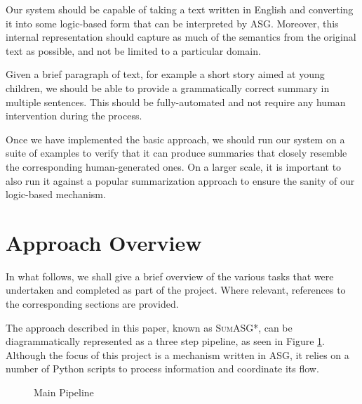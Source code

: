 \begin{objective}
Our system should be capable of taking a text written in English and converting it into some logic-based form that can be interpreted by ASG. Moreover, this internal representation should capture as much of the semantics from the original text as possible, and not be limited to a particular domain.
\end{objective}

\begin{objective}
Given a brief paragraph of text, for example a short story aimed at young children, we should be able to provide a grammatically correct summary in multiple sentences. This should be fully-automated and not require any human intervention during the process.
\end{objective}

\begin{objective}
Once we have implemented the basic approach, we should run our system on a suite of examples to verify that it can produce summaries that closely resemble the corresponding human-generated ones. On a larger scale, it is important to also run it against a popular summarization approach to ensure the sanity of our logic-based mechanism.
\end{objective}

\section{Approach Overview}

In what follows, we shall give a brief overview of the various tasks that were undertaken and completed as part of the project. Where relevant, references to the corresponding sections are provided.

The approach described in this paper, known as \textsc{SumASG*}, can be diagrammatically represented as a three step pipeline, as seen in Figure \ref{fig:main_pipeline}. Although the focus of this project is a mechanism written in ASG, it relies on a number of Python scripts to process information and coordinate its flow.

\begin{figure}[H]
\centering
{}
\caption{Main Pipeline}
\label{fig:main_pipeline}
\end{figure}

